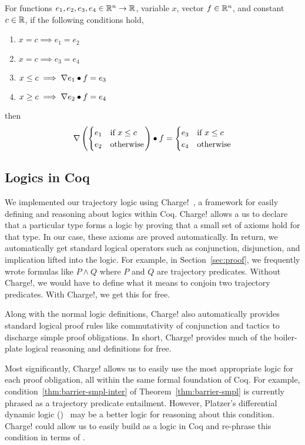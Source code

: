 \begin{lemma}
For functions $e_1, e_2, e_3, e_4 \in \mathbb{R}^n \rightarrow \mathbb{R}$, variable $x$,
vector $f \in \mathbb{R}^n$, and constant $c \in \mathbb{R}$, if the following conditions
hold,
\begin{enumerate}[label=\roman*), ref=\roman*]
\item $x = c \implies e_1 = e_2$
\item $x = c \implies e_3 = e_4$
\item $x \leq c \implies \nabla e_1 \bullet f = e_3$
\item $x \geq c \implies \nabla e_2 \bullet f = e_4$
\end{enumerate}
then
\[
\nabla \left(
\begin{cases}
e_1 & \text{if } x \leq c \\
e_2 & \text{otherwise}
\end{cases}
\right)
\bullet
f
=
\begin{cases}
e_3 & \text{if } x \leq c \\
e_4 & \text{otherwise}
\end{cases}
\]
\label{lem:pw-deriv}
\end{lemma}

\subsection{Logics in Coq}
We implemented our trajectory logic using Charge!~\cite{???}, a framework
for easily defining and reasoning about logics within Coq. Charge! allows a
us to declare that a particular type forms a logic by proving that a small
set of axioms hold for that type. In our case, these axioms are proved
automatically. In return, we automatically get standard logical operators
such as conjunction, disjunction, and implication lifted into the
logic. For example, in Section~\ref{sec:proof}, we frequently wrote
formulas like $P \wedge Q$ where $P$ and $Q$ are trajectory
predicates. Without Charge!, we would have to define what it means to
conjoin two trajectory predicates. With Charge!, we get this for free.

Along with the normal logic definitions, Charge! also automatically
provides standard logical proof rules like commutativity of conjunction and
tactics to discharge simple proof obligations. In short, Charge! provides
much of the boiler-plate logical reasoning and definitions for free.

Most significantly, Charge! allows us to easily use the most appropriate
logic for each proof obligation, all within the same formal foundation of
Coq. For example, condition~\eqref{thm:barrier-smpl-inter} of
Theorem~\ref{thm:barrier-smpl} is currently phrased as a trajectory
predicate entailment. However, Platzer's differential dynamic logic
(\dL{})~\cite{Platzer15substitution} may be a better logic for reasoning
about this condition. Charge! could allow us to easily build \dL{} as a
logic in Coq and re-phrase this condition in terms of \dL{}.

